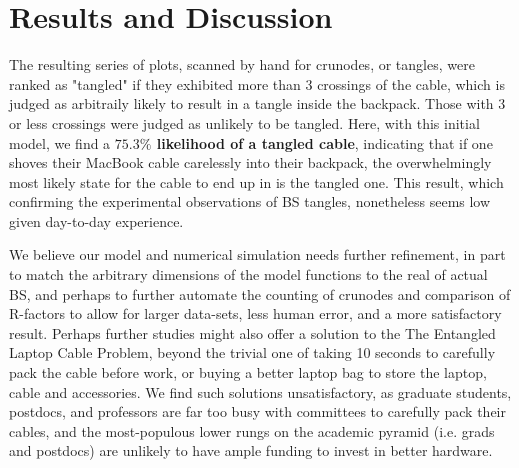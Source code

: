 \documentclass{JINST}
\begin{document}
\section{Results and Discussion} \label{sec:results}

The resulting series of plots, scanned by hand for crunodes, or tangles, were ranked as "tangled" if they exhibited more than 3 crossings of the cable, which is judged as arbitraily likely to result in a tangle inside the backpack. Those with 3 or less crossings were judged as unlikely to be tangled. Here, with this initial model, we find a \textbf{$75.3\%$ likelihood of a tangled cable}, indicating that if one shoves their MacBook cable carelessly into their backpack, the overwhelmingly most likely state for the cable to end up in is the tangled one. This result, which confirming the experimental observations of BS tangles, nonetheless seems low given day-to-day experience.

We believe our model and numerical simulation needs further refinement, in part to match the arbitrary dimensions of the model functions to the real of actual BS, and perhaps to further automate the counting of crunodes and comparison of R-factors to allow for larger data-sets, less human error, and a more satisfactory result. Perhaps further studies might also offer a solution to the The Entangled Laptop Cable Problem, beyond the trivial one of taking 10 seconds to carefully pack the cable before work, or buying a better laptop bag to store the laptop, cable and accessories. We find such solutions unsatisfactory, as graduate students, postdocs, and professors are far too busy with committees to carefully pack their cables, and the most-populous lower rungs on the academic pyramid (i.e. grads and postdocs) are unlikely to have ample funding to invest in better hardware.


 
\end{document}
